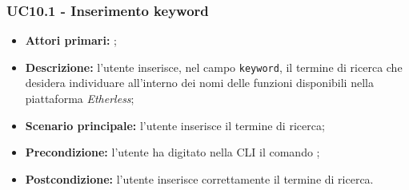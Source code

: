 \subsubsection{UC10.1 - Inserimento keyword}
\begin{itemize}
	\item \textbf{Attori primari:} \ua{};
	\item \textbf{Descrizione:} l’utente inserisce, nel campo \texttt{keyword}, il termine di ricerca che desidera individuare all’interno dei nomi delle funzioni disponibili nella piattaforma \textit{Etherless}; 
	\item \textbf{Scenario principale:} l'utente inserisce il termine di ricerca;
	\item \textbf{Precondizione:} l’utente ha digitato nella CLI il comando \search{};
	\item \textbf{Postcondizione:} l’utente inserisce correttamente il termine di ricerca. 
\end{itemize}